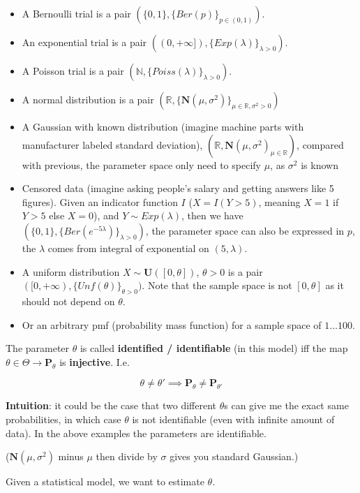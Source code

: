 \documentclass{article}
\begin{document}
\begin{itemize}
  \item A Bernoulli trial is a pair $(\{0, 1\}, \{ Ber(p) \}_{p \in (0, 1)})$.
  \item An exponential trial is a pair $((0, +\infty]), \{ Exp(\lambda) \}_{\lambda > 0})$.
  \item A Poisson trial is a pair $(\mathbb{N}, \{ Poiss(\lambda) \}_{\lambda > 0})$.
  \item A normal distribution is a pair $(\mathbb{R}, \{ \mathbf{N}(\mu, \sigma^2) \}_{\mu \in \mathbb{R}, \sigma^2 > 0})$
  \item A Gaussian with known distribution (imagine machine parts with manufacturer labeled standard deviation), $(\mathbb{R}, { \mathbf{N}(\mu, \sigma^2) }_{\mu \in \mathbb{R}})$, compared with previous, the parameter space only need to specify $\mu$, as $\sigma^2$ is known
  \item Censored data (imagine asking people's salary and getting answers like 5 figures). Given an indicator function $I$ ($X = I(Y > 5)$, meaning $X = 1$ if $Y > 5$ else $X = 0$), and $Y \sim Exp(\lambda)$, then we have $(\{0, 1\}, \{ Ber(e^{-5 \lambda}) \}_{\lambda > 0})$, the parameter space can also be expressed in $p$, the $\lambda$ comes from integral of exponential on $(5, \lambda)$.
  \item A uniform distribution $X \sim \mathbf{U}([0, \theta])$, $\theta > 0$ is a pair $([0, +\infty), \{ Unf(\theta) \}_{\theta > 0})$. Note that the sample space is not $[0, \theta]$ as it should not depend on $\theta$.
  \item Or an arbitrary pmf (probability mass function) for a sample space of $1 \dots 100$.
\end{itemize}

The parameter $\theta$ is called \textbf{identified / identifiable} (in this model) iff the map $ \theta \in \Theta \to \mathbf{P}_{\theta}$ is \textbf{injective}. I.e.

$$
\theta \neq \theta' \implies \mathbf{P}_{\theta} \neq \mathbf{P}_{\theta'}
$$

\textbf{Intuition}: it could be the case that two different $\theta$s can give me the exact same probabilities, in which case $\theta$ is not identifiable (even with infinite amount of data). In the above examples the parameters are identifiable.

($\mathbf{N}(\mu, \sigma^2)$ minus $\mu$ then divide by $\sigma$ gives you standard Gaussian.)

Given a statistical model, we want to estimate $\theta$.
\end{document}
